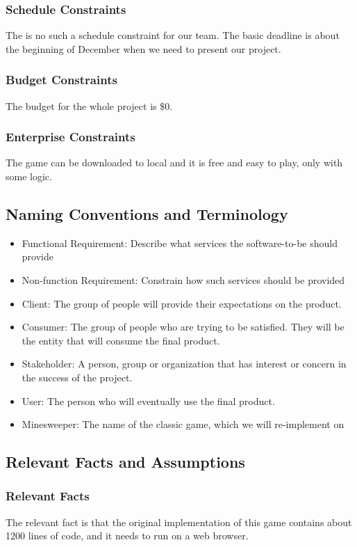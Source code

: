 \documentclass[10pt]{article}
\begin{document}
\subsubsection{Schedule Constraints}
The is no such a schedule constraint for our team. The basic deadline is about the beginning of December when we need to present our project.
\subsubsection{Budget Constraints}
The budget for the whole project is $\$0$.
\subsubsection{Enterprise Constraints}
The game can be downloaded to local and it is free and easy to play, only with some logic.
\subsection{Naming Conventions and Terminology}
\begin{itemize}
    \item Functional Requirement: Describe what services the software-to-be should provide
    \item Non-function Requirement: Constrain how such services should be provided
    \item Client: The group of people will provide their expectations on the product.
    \item Consumer: The group of people who are trying to be satisfied. They will be the entity that will consume the final product.
    \item Stakeholder: A person, group or organization that has interest or concern in the success of the project.
    \item User: The person who will eventually use the final product.
    \item  Minesweeper: The name of the classic game, which we will re-implement on
\end{itemize}
\subsection{Relevant Facts and Assumptions}
\subsubsection{Relevant Facts}
The relevant fact is that the original implementation of this game contains about 1200 lines of code, and it needs to run on a web browser.
\end{document}
